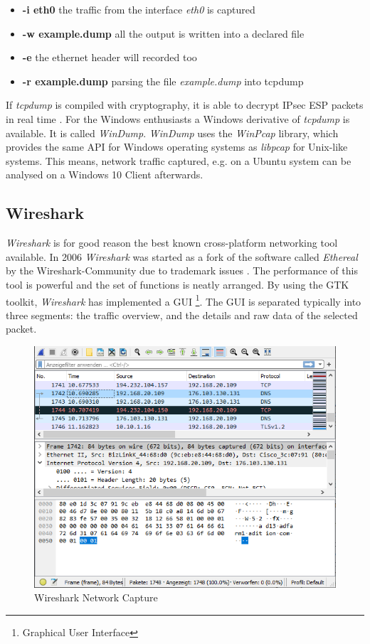 \documentclass[conference]{IEEEtran}
\begin{document}
\begin{itemize}
\item \textbf{-i eth0} the traffic from the interface \textit{eth0} is captured
\item \textbf{-w example.dump} all the output is written into a declared file
\item \textbf{-e} the ethernet header will recorded too
\item \textbf{-r example.dump} parsing the file \textit{example.dump} into tcpdump
\end{itemize}

If \textit{tcpdump} is compiled with cryptography, it is able to decrypt IPsec ESP packets in real time \cite{goyal2017}.
For the Windows enthusiasts a Windows derivative of \textit{tcpdump} is available. It is called \textit{WinDump}. \textit{WinDump} uses the \textit{WinPcap} library, which provides the same API for Windows operating systems as \textit{libpcap} for Unix-like systems. This means, network traffic captured, e.g. on a Ubuntu system can be analysed on a Windows 10 Client afterwards.

\subsection*{Wireshark}

\textit{Wireshark} is for good reason the best known cross-platform networking tool available. In 2006 \textit{Wireshark} was started as a fork of the software called \textit{Ethereal} by the Wireshark-Community due to trademark issues \cite{asrodiapatel2012}.  The performance of this tool is powerful and the set of functions is neatly arranged. By using the GTK toolkit, \textit{Wireshark} has implemented a GUI \footnote{Graphical User Interface}\cite{suribatra2012}. The GUI is separated typically into three segments: the traffic overview, and the details and raw data of the selected packet.

\begin{figure}[htbp]
\centerline{\includegraphics[scale=0.48]{wireshark.png}}
\caption{Wireshark Network Capture}
\label{wireshark}
\end{figure}
\end{document}

